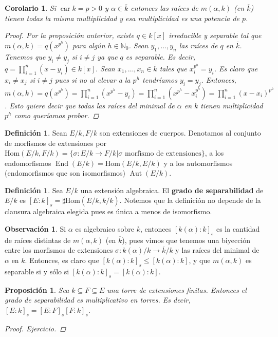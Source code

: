 \documentclass[12pt]{book}
\newtheorem{prop}[teo]{Proposición}
\newtheorem{cor}[teo]{Corolario}
\theoremstyle{definition}
\newtheorem{obs}[teo]{Observación}
\newtheorem{defn}[teo]{Definición}
\newcommand{\NN}{\mathbb{N}}
\renewcommand{\hom}{\mathrm{Hom}}
\DeclareMathOperator{\End}{End}
\DeclareMathOperator{\Aut}{Aut}
\DeclareMathOperator{\car}{car}
\begin{document}
\begin{cor}
Si $\car k = p>0$ y $\alpha\in\overline{k}$ entonces las raíces de $m(\alpha,k)$ (en $\overline{k}$) tienen todas la misma multiplicidad y esa multiplicidad es una potencia de $p$.
\begin{proof}
Por la proposición anterior, existe $q\in k[x]$ irreducible y separable tal que $m(\alpha,k) = q(x^{p^h})$ para algún $h\in\NN_0$. Sean $y_1,\ldots , y_n$ las raíces de $q$ en $\overline{k}$. Tenemos que $y_i\neq y_j$ si $i\neq j$ ya que $q$ es separable. Es decir, $q=\displaystyle\prod_{i=1}^n (x-y_i)\in\overline{k}[x]$. Sean $x_1,\ldots , x_n\in\overline{k}$ tales que $x_i^{p^h} = y_i$. Es claro que $x_i\neq x_j$ si $i\neq j$ pues si no al elevar a la $p^h$ tendríamos $y_i=y_j$. Entonces, $m(\alpha,k) = q(x^{p^h}) = \displaystyle\prod_{i=1}^n (x^{p^h} - y_i) = \prod_{i=1}^n (x^{p^h} - x_i^{p^h}) = \prod_{i=1}^n (x-x_i)^{p^h}$. Esto quiere decir que todas las raíces del minimal de $\alpha$ en $k$ tienen multiplicidad $p^h$ como queríamos probar.
\end{proof}
\end{cor}

\begin{defn}
Sean $E/k, F/k$ son extensiones de cuerpos. Denotamos al conjunto de morfismos de extensiones por $\hom(E/k,F/k) = \{\sigma:E/k\to F/k | \sigma \text{ morfismo de extensiones} \}$, a los endomorfismos $\End(E/k) = \hom(E/k,E/k)$ y a los automorfismos (endomorfismos que son isomorfismos) $\Aut(E/k)$.
\end{defn}

\begin{defn}
Sea $E/k$ una extensión algebraica. El \textbf{grado de separabilidad} de $E/k$ es $[E:k]_s = \sharp \hom(E/k,\overline{k}/k)$. Notemos que la definición no depende de la clausura algebraica elegida pues es única a menos de isomorfismo.
\end{defn}

\begin{obs}
Si $\alpha$ es algebraico sobre $k$, entonces $[k(\alpha):k]_s$ es la cantidad de raíces distintas de $m(\alpha,k)$ (en $\overline{k}$), pues vimos que tenemos una biyección entre los morfismos de extensiones $\sigma:k(\alpha)/k\to\overline{k}/k$ y las raíces del minimal de $\alpha$ en $k$. Entonces, es claro que $[k(\alpha):k]_s \leq [k(\alpha):k]$, y que $m(\alpha,k)$ es separable si y sólo si $[k(\alpha):k]_s=[k(\alpha):k]$.
\end{obs}

\begin{prop}
Sea $k\subseteq F\subseteq E$ una torre de extensiones finitas. Entonces el grado de separabilidad es multiplicativo en torres. Es decir, $[E:k]_s = [E:F]_s [F:k]_s$.
\begin{proof}
Ejercicio.
\end{proof}
\end{prop}
\end{document}
